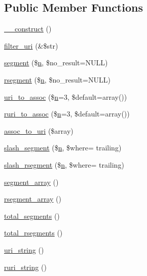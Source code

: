\subsection*{Public Member Functions}
\begin{DoxyCompactItemize}
\item 
\hyperlink{class_c_i___u_r_i_a095c5d389db211932136b53f25f39685}{\+\_\+\+\_\+construct} ()
\item 
\hyperlink{class_c_i___u_r_i_a0449aea4e186717ecbf1eacfc59fc5b6}{filter\+\_\+uri} (\&\$str)
\item 
\hyperlink{class_c_i___u_r_i_aeea297fbd38079886a2de35d633c1ed5}{segment} (\$\hyperlink{cli_2error__general_8php_ace0fd03cd383f20ce6ea63247a207294}{n}, \$no\+\_\+result=N\+U\+L\+L)
\item 
\hyperlink{class_c_i___u_r_i_a0fbd875ee8f8965b0b495b1dce0080fb}{rsegment} (\$\hyperlink{cli_2error__general_8php_ace0fd03cd383f20ce6ea63247a207294}{n}, \$no\+\_\+result=N\+U\+L\+L)
\item 
\hyperlink{class_c_i___u_r_i_a67cca74de71898ee88c167a265cff140}{uri\+\_\+to\+\_\+assoc} (\$\hyperlink{cli_2error__general_8php_ace0fd03cd383f20ce6ea63247a207294}{n}=3, \$default=array())
\item 
\hyperlink{class_c_i___u_r_i_a3f375a2026349f1fce7915966eba6d5b}{ruri\+\_\+to\+\_\+assoc} (\$\hyperlink{cli_2error__general_8php_ace0fd03cd383f20ce6ea63247a207294}{n}=3, \$default=array())
\item 
\hyperlink{class_c_i___u_r_i_a5c17149885c92fef1ed7f191f14a3f4d}{assoc\+\_\+to\+\_\+uri} (\$array)
\item 
\hyperlink{class_c_i___u_r_i_ac16fc32f9085c8ccf4d8eeae78765ae8}{slash\+\_\+segment} (\$\hyperlink{cli_2error__general_8php_ace0fd03cd383f20ce6ea63247a207294}{n}, \$where= \textquotesingle{}trailing\textquotesingle{})
\item 
\hyperlink{class_c_i___u_r_i_a644ee9ec883346bab8ba8819ee3ebf98}{slash\+\_\+rsegment} (\$\hyperlink{cli_2error__general_8php_ace0fd03cd383f20ce6ea63247a207294}{n}, \$where= \textquotesingle{}trailing\textquotesingle{})
\item 
\hyperlink{class_c_i___u_r_i_ac0db37475b7a41e156f2e9375a2b7cc6}{segment\+\_\+array} ()
\item 
\hyperlink{class_c_i___u_r_i_aaac2da0a6641a4a874a178442eb99624}{rsegment\+\_\+array} ()
\item 
\hyperlink{class_c_i___u_r_i_a5805c40e1c916e7b00b49f131765ac1c}{total\+\_\+segments} ()
\item 
\hyperlink{class_c_i___u_r_i_aead39329dc096b94eef0955fdcdd635f}{total\+\_\+rsegments} ()
\item 
\hyperlink{class_c_i___u_r_i_ac7a3f945c14cc37f89b6d9d1c7a037a4}{uri\+\_\+string} ()
\item 
\hyperlink{class_c_i___u_r_i_a53a97a8b68f500980b84e3b060400221}{ruri\+\_\+string} ()
\end{DoxyCompactItemize}
